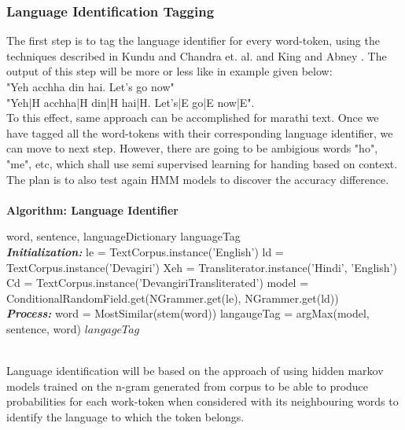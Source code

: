 \documentclass[conference]{IEEEtran}
\begin{document}
\subsubsection{Language Identification Tagging}
The first step is to tag the language identifier for every word-token, using the techniques described in Kundu and Chandra et. al.
\cite{kundu_automatic_2012} and King and Abney \cite{king_labeling_2013}. The
output of this step will be more or less like in example given below:\\

\hspace{8em}"Yeh acchha din hai. Let's go now" \\
\hspace{8em}"Yeh|H acchha|H din|H hai|H. Let's|E go|E now|E". \\
To this effect, same approach can be accomplished for marathi text. Once we have tagged all the
word-tokens with their corresponding language identifier, we can move to next
step. However, there are going to be ambigious words "ho", "me", etc, which
shall use semi supervised learning for handing based on context. The plan is to
also test again HMM models to discover the accuracy difference.\\

\\
\hline
\textbf{ Algorithm: Language Identifier }
\hline
\begin{algorithmic}[1]
 \renewcommand{\algorithmicrequire}{\textbf{Input:}}
 \renewcommand{\algorithmicensure}{\textbf{Output:}}
 \REQUIRE word, sentence, languageDictionary
 \ENSURE  languageTag
 \\ \textbf{\textit{Initialization:}}
 \STATE le = TextCorpus.instance('English')
 \STATE ld = TextCorpus.instance('Devagiri')
 \STATE Xeh = Transliterator.instance('Hindi', 'English')
 \STATE Cd = TextCorpus.instance('DevangiriTransliterated')
 \STATE model = ConditionalRandomField.get(NGrammer.get(le), NGrammer.get(ld))
 \\ \textbf{\textit{Process:}}
  \STATE word = MostSimilar(stem(word))
 \ENDIF
 \STATE langaugeTag = argMax(model, sentence, word)
 \RETURN $langageTag$
\end{algorithmic} 
\hline
\\

Language identification will be based on the approach of using hidden markov
models trained on the n-gram generated from corpus to be able to produce
probabilities for each work-token when considered with its neighbouring words
to identify the language to which the token belongs.\\
\end{document}
